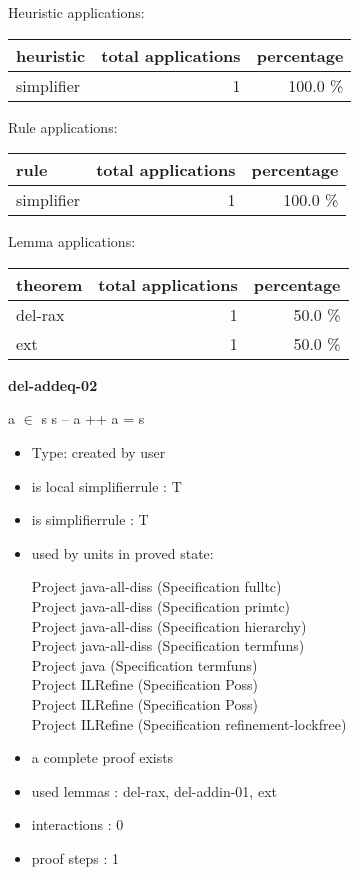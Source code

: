 \documentclass[a4paper]{article}
\begin{document}
\medskip


Heuristic applications:

\begin{supertabular}{l|r|r}
heuristic	& total applications & percentage \\ \hline
simplifier & 1 & 100.0 \% \\

\end{supertabular}

Rule applications:

\begin{supertabular}{l|r|r}
rule	        & total applications & percentage \\ \hline
simplifier & 1 & 100.0 \% \\

\end{supertabular}

Lemma applications:

\begin{supertabular}{l|r|r}
theorem	        & total applications & percentage \\ \hline
del-rax & 1 & 50.0 \% \\
ext & 1 & 50.0 \% \\

\end{supertabular}
\pagebreak

{\LARGE\bf del-addeq-02}\label{lemma-del-addeq-02}

\medskip

 \Fol a $\in$ s \Imp s -- a ++ a = s

\begin{itemize}

\item Type: created by user

\item is local simplifierrule : T
\item is simplifierrule : T
\item used by units in proved state:

Project java-all-diss (Specification fulltc) \\
Project java-all-diss (Specification primtc) \\
Project java-all-diss (Specification hierarchy) \\
Project java-all-diss (Specification termfuns) \\
Project java (Specification termfuns) \\
Project ILRefine (Specification Poss) \\
Project ILRefine (Specification Poss) \\
Project ILRefine (Specification refinement-lockfree)
\item       a complete proof exists
\item       used lemmas  : del-rax, del-addin-01, ext
\item       interactions : 0
\item       proof steps  : 1
\end{itemize}
\end{document}

